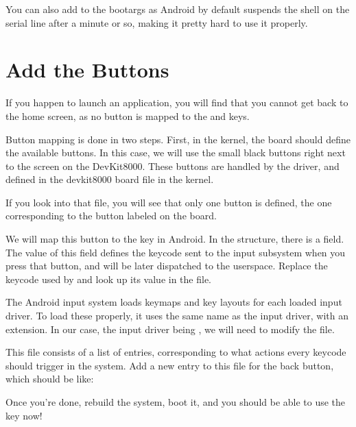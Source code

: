 You can also add  to the bootargs as Android by
default suspends the shell on the serial line after a minute or so, making it pretty
hard to use it properly.

\section{Add the Buttons}

If you happen to launch an application, you will find that you cannot
get back to the home screen, as no button is mapped to the  and 
keys.

Button mapping is done in two steps. First, in the kernel, the
board should define the available buttons. In this case, we will use
the small black buttons right next to the screen on the
DevKit8000. These buttons are handled by the  driver,
and defined in the devkit8000 board file in the kernel.

If you look into that file, you will see that only one button is
defined, the one corresponding to the button labeled 
on the board.

We will map this button to the  key in Android. In the
 structure, there is a  field. The
value of this field defines the keycode sent to the input
subsystem when you press that button, and will be later dispatched to
the userspace. Replace the keycode used by  and look up
its value in the  file.

The Android input system loads keymaps and key layouts for each loaded input
driver. To load these properly, it uses the same name as the
input driver, with an extension. In our case, the input driver being
, we will need to modify the  file.

This file consists of a list of entries, corresponding to what actions
every keycode should trigger in the system. Add a new entry to this file
for the back button, which should be like:

Once you're done, rebuild the system, boot it, and you should be able
to use the  key now!
